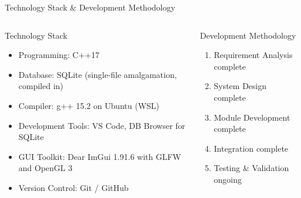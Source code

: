 \documentclass[aspectratio=169,11pt]{beamer}
\begin{document}
\begin{frame}{Technology Stack \& Development Methodology}

\begin{columns}[T,totalwidth=\textwidth]


\begin{block}{Technology Stack}
\scriptsize
\begin{itemize}\itemsep2pt
\item Programming: C++17
\item Database: SQLite (single-file amalgamation, compiled in)
\item Compiler: g++ 15.2 on Ubuntu (WSL)
\item Development Tools: VS Code, DB Browser for SQLite
\item GUI Toolkit: Dear ImGui 1.91.6 with GLFW and OpenGL 3
\item Version Control: Git / GitHub
\end{itemize}
\end{block}


\begin{block}{Development Methodology}
\scriptsize
\begin{enumerate}\itemsep2pt
\item Requirement Analysis \hfill {\color{GEUGrey}complete}
\item System Design \hfill {\color{GEUGrey}complete}
\item Module Development \hfill {\color{GEUGrey}complete}
\item Integration \hfill {\color{GEUGrey}complete}
\item Testing \& Validation \hfill {\color{GEUGrey}ongoing}
\end{enumerate}
\end{block}

\end{columns}

\vfill


\end{frame}
\end{document}
